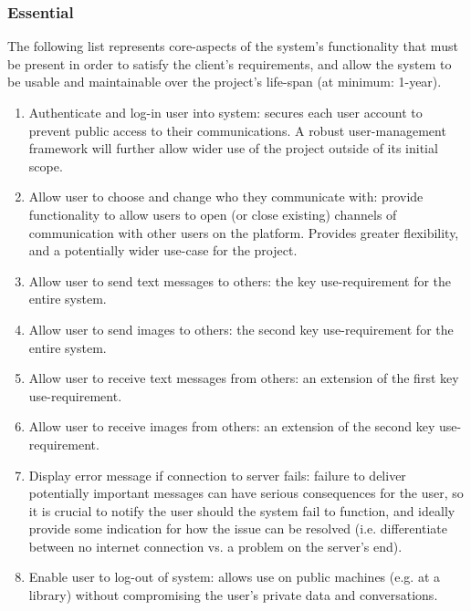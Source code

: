 \documentclass[11pt]{article}
\begin{document}
\subsubsection{Essential}
The following list represents core-aspects of the system's functionality that must be present in
order to satisfy the client's requirements, and allow the system to be usable and maintainable over
the project's life-span (at minimum: 1-year).
\begin{enumerate}
    \item Authenticate and log-in user into system: secures each user account to prevent public
        access to their communications. A robust user-management framework will further allow
        wider use of the project outside of its initial scope.
    \item Allow user to choose and change who they communicate with: provide functionality to allow
        users to open (or close existing) channels of communication with other users on the
        platform. Provides greater flexibility, and a potentially wider use-case for the project.
    \item Allow user to send text messages to others: the key use-requirement for the entire system.
    \item Allow user to send images to others: the second key use-requirement for the entire system.
    \item Allow user to receive text messages from others: an extension of the first key
        use-requirement.
    \item Allow user to receive images from others: an extension of the second key use-requirement.
    \item Display error message if connection to server fails: failure to deliver potentially
        important messages can have serious consequences for the user, so it is crucial to notify
        the user should the system fail to function, and ideally provide some indication for how the
        issue can be resolved (i.e.  differentiate between no internet connection vs. a problem on
        the server's end).
    \item Enable user to log-out of system: allows use on public machines (e.g. at a library)
        without compromising the user's private data and conversations.
\end{enumerate}
\end{document}
